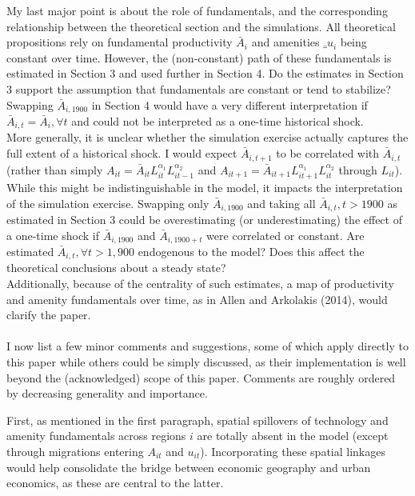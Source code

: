 \documentclass[10pt, final]{article}
\begin{document}
My last major point is about the role of fundamentals, and the corresponding relationship between the theoretical section and the simulations. All theoretical propositions rely on fundamental productivity $\bar{A}_i$ and amenities $\bar_{u}_i$ being constant over time. However, the (non-constant) path of these fundamentals is estimated in Section 3 and used further in Section 4. Do the estimates in Section 3 support the assumption that fundamentals are constant or tend to stabilize? 
Swapping $\bar{A}_{i,1900}$ in Section 4 would have a very different interpretation if $\bar{A}_{i,t} = \bar{A}_i, \forall t$ and could not be interpreted as a one-time historical shock.
\\
More generally, it is unclear whether the simulation exercise actually captures the full extent of a historical shock. I would expect $\bar{A}_{i,t+1}$ to be correlated with $\bar{A}_{i,t}$ (rather than simply $A_{it} = \bar{A}_{it} L_{it}^{\alpha_1} L_{it-1}^{\alpha_2}$ and $A_{it+1} = \bar{A}_{it+1} L_{it+1}^{\alpha_1} L_{it}^{\alpha_2}$ through $L_{it}$).
While this might be indistinguishable in the model, it impacts the interpretation of the simulation exercise.
Swapping only $\bar{A}_{i,1900}$ and taking all $\bar{A}_{i,t}, t > 1900$ as estimated in Section 3 could be overestimating (or underestimating) the effect of a one-time shock if $\bar{A}_{i,1900}$ and $\bar{A}_{i,1900+t}$ were correlated or constant. 
Are estimated $\bar{A}_{i,t}, \forall t > 1,900$ endogenous to the model? Does this affect the theoretical conclusions about a steady state?
\\
Additionally, because of the centrality of such estimates, a map of productivity and amenity fundamentals over time, as in Allen and Arkolakis (2014), would clarify the paper.
\\
\\

I now list a few minor comments and suggestions, some of which apply directly to this paper while others could be simply discussed, as their implementation is well beyond the (acknowledged) scope of this paper. Comments are roughly ordered by decreasing generality and importance.

First, as mentioned in the first paragraph, spatial spillovers of technology and amenity fundamentals across regions $i$ are totally absent in the model (except through migrations entering $A_{it}$ and $u_{it}$). Incorporating these spatial linkages would help consolidate the bridge between economic geography and urban economics, as these are central to the latter.
\end{document}
